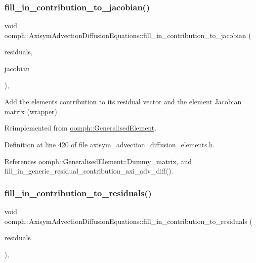 \subsubsection{\texorpdfstring{fill\+\_\+in\+\_\+contribution\+\_\+to\+\_\+jacobian()}{fill\_in\_contribution\_to\_jacobian()}}
{\footnotesize\ttfamily void oomph\+::\+Axisym\+Advection\+Diffusion\+Equations\+::fill\+\_\+in\+\_\+contribution\+\_\+to\+\_\+jacobian (\begin{DoxyParamCaption}\item[{\hyperlink{classoomph_1_1Vector}{Vector}$<$ double $>$ \&}]{residuals,  }\item[{\hyperlink{classoomph_1_1DenseMatrix}{Dense\+Matrix}$<$ double $>$ \&}]{jacobian }\end{DoxyParamCaption})\hspace{0.3cm}{\ttfamily [inline]}, {\ttfamily [virtual]}}



Add the element\textquotesingle{}s contribution to its residual vector and the element Jacobian matrix (wrapper) 



Reimplemented from \hyperlink{classoomph_1_1GeneralisedElement_a6ae09fc0d68e4309ac1b03583d252845}{oomph\+::\+Generalised\+Element}.



Definition at line 420 of file axisym\+\_\+advection\+\_\+diffusion\+\_\+elements.\+h.



References oomph\+::\+Generalised\+Element\+::\+Dummy\+\_\+matrix, and fill\+\_\+in\+\_\+generic\+\_\+residual\+\_\+contribution\+\_\+axi\+\_\+adv\+\_\+diff().

\mbox{\label{classoomph_1_1AxisymAdvectionDiffusionEquations_a00d9356ebf0f2fe1a5f470db379c9bd9}} 
\subsubsection{\texorpdfstring{fill\+\_\+in\+\_\+contribution\+\_\+to\+\_\+residuals()}{fill\_in\_contribution\_to\_residuals()}}
{\footnotesize\ttfamily void oomph\+::\+Axisym\+Advection\+Diffusion\+Equations\+::fill\+\_\+in\+\_\+contribution\+\_\+to\+\_\+residuals (\begin{DoxyParamCaption}\item[{\hyperlink{classoomph_1_1Vector}{Vector}$<$ double $>$ \&}]{residuals }\end{DoxyParamCaption})\hspace{0.3cm}{\ttfamily [inline]}, {\ttfamily [virtual]}}



